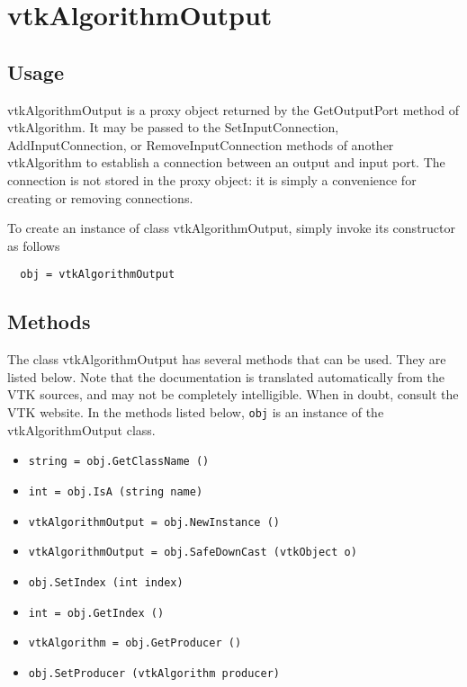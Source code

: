 \section{vtkAlgorithmOutput}

\subsection{Usage}

 vtkAlgorithmOutput is a proxy object returned by the GetOutputPort
 method of vtkAlgorithm.  It may be passed to the
 SetInputConnection, AddInputConnection, or RemoveInputConnection
 methods of another vtkAlgorithm to establish a connection between
 an output and input port.  The connection is not stored in the
 proxy object: it is simply a convenience for creating or removing
 connections.

To create an instance of class vtkAlgorithmOutput, simply
invoke its constructor as follows
\begin{verbatim}
  obj = vtkAlgorithmOutput
\end{verbatim}
\subsection{Methods}

The class vtkAlgorithmOutput has several methods that can be used.
  They are listed below.
Note that the documentation is translated automatically from the VTK sources,
and may not be completely intelligible.  When in doubt, consult the VTK website.
In the methods listed below, \verb|obj| is an instance of the vtkAlgorithmOutput class.
\begin{itemize}
\item  \verb|string = obj.GetClassName ()|

\item  \verb|int = obj.IsA (string name)|

\item  \verb|vtkAlgorithmOutput = obj.NewInstance ()|

\item  \verb|vtkAlgorithmOutput = obj.SafeDownCast (vtkObject o)|

\item  \verb|obj.SetIndex (int index)|

\item  \verb|int = obj.GetIndex ()|

\item  \verb|vtkAlgorithm = obj.GetProducer ()|

\item  \verb|obj.SetProducer (vtkAlgorithm producer)|

\end{itemize}
